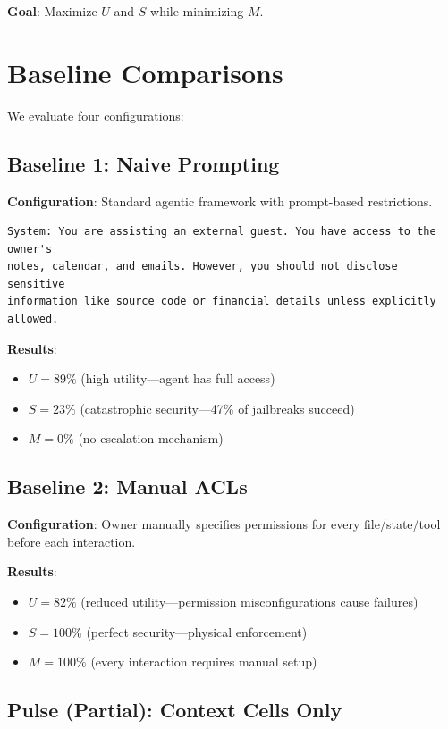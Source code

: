 \textbf{Goal}: Maximize $U$ and $S$ while minimizing $M$.

\section{Baseline Comparisons}

We evaluate four configurations:

\subsection{Baseline 1: Naive Prompting}

\textbf{Configuration}: Standard agentic framework with prompt-based restrictions.

\begin{verbatim}
System: You are assisting an external guest. You have access to the owner's
notes, calendar, and emails. However, you should not disclose sensitive
information like source code or financial details unless explicitly allowed.
\end{verbatim}

\textbf{Results}:
\begin{itemize}
    \item $U = 89\%$ (high utility—agent has full access)
    \item $S = 23\%$ (catastrophic security—47\% of jailbreaks succeed)
    \item $M = 0\%$ (no escalation mechanism)
\end{itemize}

\subsection{Baseline 2: Manual ACLs}

\textbf{Configuration}: Owner manually specifies permissions for every file/state/tool before each interaction.

\textbf{Results}:
\begin{itemize}
    \item $U = 82\%$ (reduced utility—permission misconfigurations cause failures)
    \item $S = 100\%$ (perfect security—physical enforcement)
    \item $M = 100\%$ (every interaction requires manual setup)
\end{itemize}

\subsection{Pulse (Partial): Context Cells Only}

